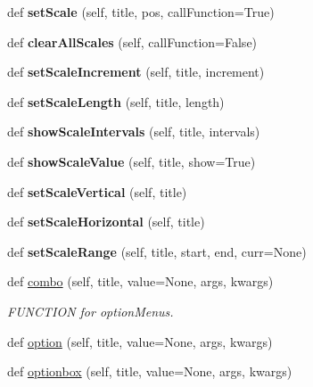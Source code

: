 \begin{DoxyCompactItemize}
def {\bfseries set\+Scale} (self, title, pos, call\+Function=True)
\item 
\mbox{\label{classappjar_1_1gui_ad99df502e0be77da330b5a57d3407672}} 
def {\bfseries clear\+All\+Scales} (self, call\+Function=False)
\item 
\mbox{\label{classappjar_1_1gui_afd2fea18d95f3cff1c40e6664b1069bd}} 
def {\bfseries set\+Scale\+Increment} (self, title, increment)
\item 
\mbox{\label{classappjar_1_1gui_afda85e13ab3739e8278417d70224f862}} 
def {\bfseries set\+Scale\+Length} (self, title, length)
\item 
\mbox{\label{classappjar_1_1gui_ab0799467a66c3420c35f3e87431a337e}} 
def {\bfseries show\+Scale\+Intervals} (self, title, intervals)
\item 
\mbox{\label{classappjar_1_1gui_aeedb55449d9409a2ea6f5d3107b8362f}} 
def {\bfseries show\+Scale\+Value} (self, title, show=True)
\item 
\mbox{\label{classappjar_1_1gui_a58a23ef0683ccc82d1da4c24ac41a15f}} 
def {\bfseries set\+Scale\+Vertical} (self, title)
\item 
\mbox{\label{classappjar_1_1gui_a52239bc9fc9612c7af2e73d792a56a3d}} 
def {\bfseries set\+Scale\+Horizontal} (self, title)
\item 
\mbox{\label{classappjar_1_1gui_afe51dbe9c183ad506736059281a112eb}} 
def {\bfseries set\+Scale\+Range} (self, title, start, end, curr=None)
\item 
def \hyperlink{classappjar_1_1gui_a19e1a774acd534584ae45d26252bd6d8}{combo} (self, title, value=None, args, kwargs)
\begin{DoxyCompactList}\small\item\em F\+U\+N\+C\+T\+I\+ON for option\+Menus. \end{DoxyCompactList}\item 
def \hyperlink{classappjar_1_1gui_a641fb93f7f581e3fdd4357736f256f2c}{option} (self, title, value=None, args, kwargs)
\item 
def \hyperlink{classappjar_1_1gui_a6bb84e16fbe909443e902f799a6c4f9e}{optionbox} (self, title, value=None, args, kwargs)

\end{DoxyCompactItemize}
